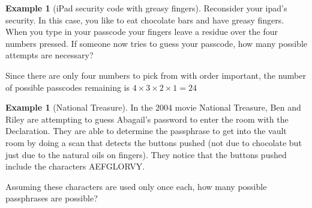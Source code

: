 \documentclass[10pt,]{book}
\theoremstyle{plain}
\theoremstyle{definition}
\theoremstyle{definition}
\newtheorem{example}[theorem]{Example}
\theoremstyle{definition}
\numberwithin{equation}{section}
\begin{document}
\begin{example}[iPad security code with greasy fingers]\label{example-7}
Reconsider your ipad's security. In this case, you like to eat
		chocolate bars and have greasy fingers. When you type in your passcode
		your fingers leave a residue over the four numbers pressed. If someone
		now tries to guess your passcode, how many possible attempts are necessary?%
\par
Since there are only four numbers to pick from with order important, the number of possible passcodes remaining is \(4 \times 3 \times 2 \times 1 = 24\)%
\end{example}
\begin{example}[National Treasure]\label{example-8}
In the 2004 movie National Treasure, Ben and Riley are attempting 
		to guess Abagail's password to enter the room with the Declaration. 
		They are able
		to determine the passphrase to get into the vault room by doing a scan
		that detects the buttons pushed (not due to chocolate but just due to 
		the natural oils on fingers). They notice that the buttons pushed 
		include the characters AEFGLORVY.%
\par
Assuming these characters are used only once each, how many possible
		passphrases are possible?%
\par


\end{example}
\end{document}
